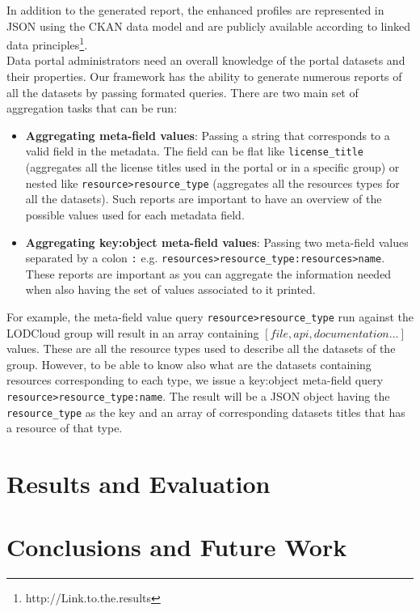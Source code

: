 \documentclass[runningheads,a4paper]{llncs}
\begin{document}
In addition to the generated report, the enhanced profiles are represented in JSON using the CKAN data model and are publicly available according to linked data principles\footnote{http://Link.to.the.results}.\\

Data portal administrators need an overall knowledge of the portal datasets and their properties. Our framework has the ability to generate numerous reports of all the datasets by passing formated queries. There are two main set of aggregation tasks that can be run:
\begin{itemize}
  \item \textbf{Aggregating meta-field values}: Passing a string that corresponds to a valid field in the metadata. The field can be flat like \texttt{license\_title} (aggregates all the license titles used in the portal or in a specific group) or nested like \texttt{resource>resource\_type} (aggregates all the resources types for all the datasets). Such reports are important to have an overview of the possible values used for each metadata field.
  \item \textbf{Aggregating key:object meta-field values}: Passing two meta-field values separated by a colon \texttt{:} e.g. \texttt{resources>resource\_type:resources>name}. These reports are important as you can aggregate the information needed when also having the set of values associated to it printed.
\end{itemize}

For example, the meta-field value query \texttt{resource>resource\_type} run against the LODCloud group will result in an array containing $[file,api,documentation ...]$ values. These are all the resource types used to describe all the datasets of the group. However, to be able to know also what are the datasets containing resources corresponding to each type, we issue a key:object meta-field query \texttt{resource>resource\_type:name}. The result will be a JSON object having the \texttt{resource\_type} as the key and an array of corresponding datasets titles that has a resource of that type.


\section{Results and Evaluation}
\label{sec:Results and Evaluation}

\section{Conclusions and Future Work}
\label{sec:Conclusion and Future Work}


\nocite{*}

\end{document}
